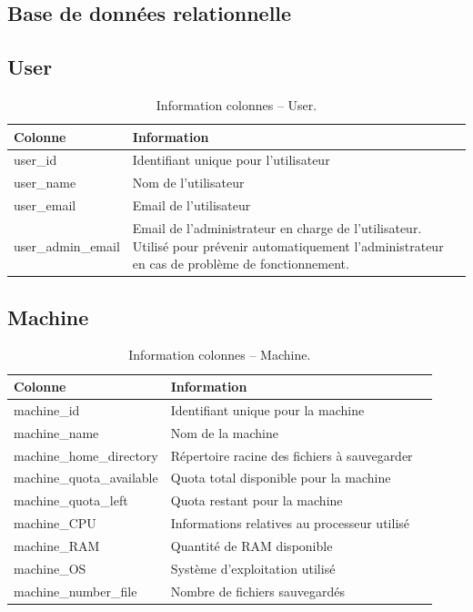 \documentclass[a4paper,10pt, twoside]{report}
\begin{document}
\begin{spacing}{1.2}
\chapter{Base de données relationnelle}
\thispagestyle{fancy}
\label{annBDR}
\thispagestyle{fancy}
\section{User}
\begin{table}[h!]
  \centering
  \def\arraystretch{1.5}
  \setlength{\fboxsep}{13pt} %
  \setlength{\fboxrule}{0pt} %
  \begin{tabular}{lm{6cm}m{6cm}}
   \rowcolor{arkred} 
    \arrayrulecolor{gray73}\hline
    \color{white} \textbf{Colonne} & \color{white} \textbf{Information}\\
    \hline
    user\_id & Identifiant unique pour l'utilisateur\\
    \hline
    user\_name & Nom de l'utilisateur\\
    \hline
    user\_email & Email de l'utilisateur\\
    \hline
    user\_admin\_email & Email de l'administrateur en charge de l'utilisateur.
    Utilisé pour prévenir automatiquement l'administrateur en cas de
    problème de fonctionnement.
  \end{tabular}
  \caption{\label{tabDBRUser} Information colonnes -- User.}
\end{table}

\section{Machine}
\begin{table}[h!]
  \centering
  \def\arraystretch{1.5}
  \setlength{\fboxsep}{13pt} %
  \setlength{\fboxrule}{0pt} %
  \begin{tabular}{lm{6cm}m{6cm}}
   \rowcolor{arkred} 
    \arrayrulecolor{gray73}\hline
    \color{white} \textbf{Colonne} & \color{white} \textbf{Information}\\
    \hline
    machine\_id & Identifiant unique pour la machine\\
    \hline
    machine\_name & Nom de la machine\\
    \hline
    machine\_home\_directory & Répertoire racine des fichiers à
    sauvegarder\\
    \hline
    machine\_quota\_available & Quota total disponible pour la machine\\
    \hline
    machine\_quota\_left & Quota restant pour la machine\\
    \hline
    machine\_CPU & Informations relatives au processeur utilisé\\
    \hline
    machine\_RAM & Quantité de RAM disponible\\
    \hline
    machine\_OS & Système d'exploitation utilisé\\
    \hline
    machine\_number\_file & Nombre de fichiers sauvegardés
  \end{tabular}
  \caption{\label{tabDBRMachine} Information colonnes -- Machine.}
\end{table}


\end{spacing}
\end{document}
